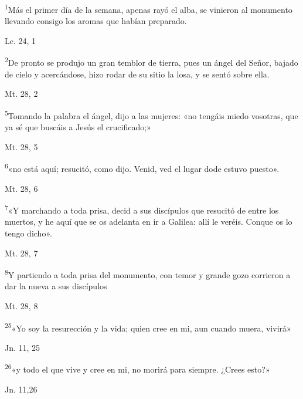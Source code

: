 \documentclass[a4paper,11pt]{article}
\begin{document}
      \textsuperscript{1}Más el primer día de la semana, apenas rayó el alba, se vinieron al monumento llevando consigo los aromas
      que habían preparado.
      \begin{flushright}
        Lc. 24, 1        
      \end{flushright}

      \textsuperscript{2}De pronto se produjo un gran temblor de tierra, pues un ángel del Señor, bajado de cielo y acercándose, hizo rodar
      de su sitio la losa, y se sentó sobre ella.
      \begin{flushright}
        Mt. 28, 2        
      \end{flushright}      
      
      \textsuperscript{5}Tomando la palabra el ángel, dijo a las mujeres: «no tengáis miedo vosotras, que ya sé que buscáis a Jesús el crucificado;»
      \begin{flushright}
        Mt. 28, 5        
      \end{flushright}

      \textsuperscript{6}«no está aquí; resucitó, como dijo. Venid, ved el lugar dode estuvo puesto».
      \begin{flushright}
        Mt. 28, 6       
      \end{flushright}

      \textsuperscript{7}«Y marchando a toda prisa, decid a sus discípulos que resucitó de entre los muertos, y he aquí que se os adelanta en ir a Galilea:
      allí le veréis. Conque os lo tengo dicho».
      \begin{flushright}
        Mt. 28, 7     
      \end{flushright}

      \textsuperscript{8}Y partiendo a toda prisa del monumento, con temor y grande gozo corrieron a dar la nueva a sus discípulos
      \begin{flushright}
        Mt. 28, 8       
      \end{flushright}

      \textsuperscript{25}«Yo soy la resurección y la vida; quien cree en mi, aun cuando muera, vivirá»
      \begin{flushright}
        Jn. 11, 25    
      \end{flushright}

      \textsuperscript{26}«y todo el que vive y cree en mi, no morirá para siempre. ¿Crees esto?»
      \begin{flushright}
        Jn. 11,26     
      \end{flushright}
\end{document}
